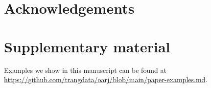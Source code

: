 \section{Acknowledgements}

\section{Supplementary material}

Examples we show in this manuscript can be found at \url{https://github.com/trangdata/oarj/blob/main/paper-examples.md}.

